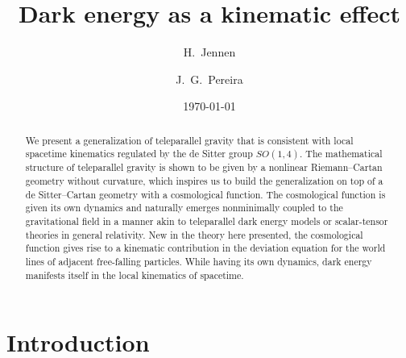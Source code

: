 \documentclass[%
5p,
times,
sort&compress
]{elsarticle}
\begin{document}
\title{Dark energy as a kinematic effect}

\author[ift]{H.~Jennen}

\author[ift]{J.~G.~Pereira}


\address[ift]{%
  Instituto de F\'{\i}sica Te\'orica, UNESP - Universidade 
  Estadual Paulista, \\
  Rua Dr.~Bento Teobaldo Ferraz, 271 -- Bl.~II, 01140-070, S\~ao 
  Paulo, SP,  Brazil
}
\date{\today}

\begin{abstract}
We present a generalization of teleparallel gravity that is 
consistent with local spacetime kinematics regulated by the de 
Sitter group $SO(1,4)$. The mathematical structure of 
teleparallel gravity is shown to be given by a nonlinear 
Riemann--Cartan geometry without curvature, which inspires us to 
build the generalization on top of a de Sitter--Cartan geometry 
with a cosmological function. The cosmological function is given 
its own dynamics and naturally emerges nonminimally coupled to 
the gravitational field in a manner akin to teleparallel dark 
energy models or scalar-tensor theories in general relativity.  
New in the theory here presented, the cosmological function gives 
rise to a kinematic contribution in the deviation equation for 
the world lines of adjacent free-falling particles. While having 
its own dynamics, dark energy manifests itself in the local 
kinematics of spacetime.
\end{abstract}

\maketitle

\section{Introduction}
\end{document}
